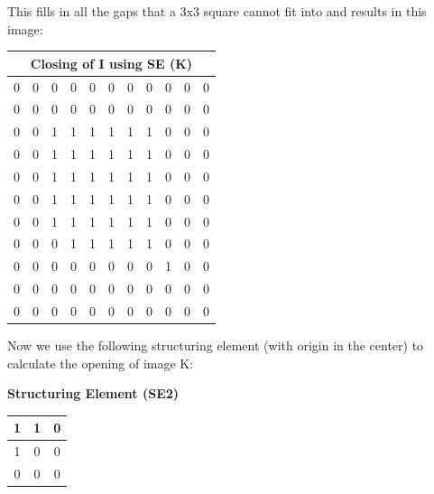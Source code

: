 \documentclass{article}
\begin{document}
\begin{enumerate}
    This fills in all the gaps that a 3x3 square cannot fit into and results in this image:

    \begin{center}
        \begin{tabular}{|c|c|c|c|c|c|c|c|c|c|c|}
        \multicolumn{11}{c}{\textbf{Closing of I using SE (K)}} \\
        \hline
        0 & 0 & 0 & 0 & 0 & 0 & 0 & 0 & 0 & 0 & 0 \\
        \hline
        0 & 0 & 0 & 0 & 0 & 0 & 0 & 0 & 0 & 0 & 0 \\
        \hline
        0 & 0 & \cellcolor{blue!20}1 & \cellcolor{blue!20}1 & \cellcolor{blue!20}1 & \cellcolor{blue!20}1 & \cellcolor{blue!20}1 & \cellcolor{blue!20}1 & 0 & 0 & 0 \\
        \hline
        0 & 0 & \cellcolor{blue!20}1 & \cellcolor{blue!20}1 & \cellcolor{blue!20}1 & \cellcolor{blue!20}1 & \cellcolor{blue!20}1 & \cellcolor{blue!20}1 & 0 & 0 & 0 \\
        \hline
        0 & 0 & \cellcolor{blue!20}1 & \cellcolor{blue!20}1 & \cellcolor{blue!20}1 & \cellcolor{blue!20}1 & \cellcolor{blue!20}1 & \cellcolor{blue!20}1 & 0 & 0 & 0 \\
        \hline
        0 & 0 & \cellcolor{blue!20}1 & \cellcolor{blue!20}1 & \cellcolor{blue!20}1 & \cellcolor{blue!20}1 & \cellcolor{blue!20}1 & \cellcolor{blue!20}1 & 0 & 0 & 0 \\
        \hline
        0 & 0 & \cellcolor{blue!20}1 & \cellcolor{blue!20}1 & \cellcolor{blue!20}1 & \cellcolor{blue!20}1 & \cellcolor{blue!20}1 & \cellcolor{blue!20}1 & 0 & 0 & 0 \\
        \hline
        0 & 0 & 0 & \cellcolor{blue!20}1 & \cellcolor{blue!20}1 & \cellcolor{blue!20}1 & \cellcolor{blue!20}1 & \cellcolor{blue!20}1 & 0 & 0 & 0 \\
        \hline
        0 & 0 & 0 & 0 & 0 & 0 & 0 & 0 & \cellcolor{blue!20}1 & 0 & 0 \\
        \hline
        0 & 0 & 0 & 0 & 0 & 0 & 0 & 0 & 0 & 0 & 0 \\
        \hline
        0 & 0 & 0 & 0 & 0 & 0 & 0 & 0 & 0 & 0 & 0 \\
        \hline
        \end{tabular}
    \end{center}

    Now we use the following structuring element (with origin in the center) to calculate the opening of image K:

    \begin{center}
        \textbf{Structuring Element (SE2)} \\
        \begin{tabular}{|c|c|c|}
        \hline
        1 & 1 & 0 \\
        \hline
        1 & 0 & 0 \\
        \hline
        0 & 0 & 0 \\
        \hline
        \end{tabular}
    \end{center}


\end{enumerate}
\end{document}
